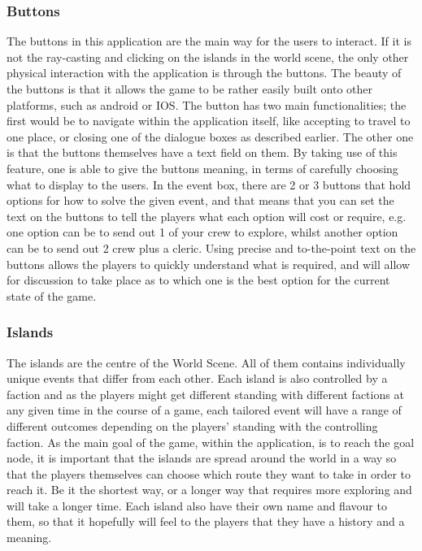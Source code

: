 \subsubsection{Buttons}	
The buttons in this application are the main way for the users to interact. If it is not the ray-casting and clicking on the islands in the world scene, the only other physical interaction with the application is through the buttons. The beauty of the buttons is that it allows the game to be rather easily built onto other platforms, such as android or IOS. The button has two main functionalities; the first would be to navigate within the application itself, like accepting to travel to one place, or closing one of the dialogue boxes as described earlier. The other one is that the buttons themselves have a text field on them. By taking use of this feature, one is able to give the buttons meaning, in terms of carefully choosing what to display to the users. In the event box, there are 2 or 3 buttons that hold options for how to solve the given event, and that means that you can set the text on the buttons to tell the players what each option will cost or require, e.g. one option can be to send out 1 of your crew to explore, whilst another option can be to send out 2 crew plus a cleric. Using precise and to-the-point text on the buttons allows the players to quickly understand what is required, and will allow for discussion to take place as to which one is the best option for the current state of the game.

\subsubsection{Islands}
The islands are the centre of the World Scene. All of them contains individually unique events that differ from each other. Each island is also controlled by a faction and as the players might get different standing with different factions at any given time in the course of a game, each tailored event will have a range of different outcomes depending on the players' standing with the controlling faction. 
As the main goal of the game, within the application, is to reach the goal node, it is important that the islands are spread around the world in a way so that the players themselves can choose which route they want to take in order to reach it. Be it the shortest way, or a longer way that requires more exploring and will take a longer time. Each island also have their own name and flavour to them, so that it hopefully will feel to the players that they have a history and a meaning.

